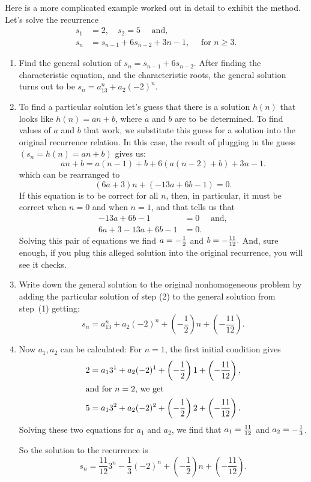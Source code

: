 \clearpage
\begin{exmp}
 Here is a more complicated example worked out in 
 detail to exhibit the
 method. Let's solve the recurrence
\begin{align*}
  s_1 &=2,\quad s_2=5 \quad\text{ and}, \\
  s_n &=s_{n-1}+6s_{n-2}+3n-1, \quad\text{ for $n\geq3.$}
\end{align*}
\begin{enumerate}[label=Step (\arabic*):]
  \item Find the general solution of $s_n=s_{n-1}+6s_{n-2}.$ After
  finding the characteristic equation, and the characteristic roots, the
  general solution turns out to be $s_n=a_13^n+a_2(-2)^n$.
  
  \item To find a particular solution let's guess that there is a
  solution $h(n)$ that looks like $h(n)=an+b$, where $a$ and $b$ are to be
  determined. To find values of $a$ and $b$ that work, we substitute this
  guess for a solution into the original recurrence relation. In this
  case, the result of plugging in the guess $(s_n=h(n)=an+b)$ gives us:
  \[
   an+b=a(n-1)+b+6(a(n-2)+b)+3n-1.
  \]
  which can be rearranged to
  \[
   (6a+3)n+(-13a+6b-1)=0.
  \]
  If this equation is to be correct for all $n$, then, in particular, it
  must be correct when $n=0$ and when $n=1$, and that tells us that
  \begin{align*}
       -13a+6b-1&=0 \quad\text{ and}, \\
   6a+3-13a+6b-1&=0.
  \end{align*} 
  Solving this pair of equations we find $a=-{1\over2}$ and
  $b=-{{11}\over{12}}.$ And, sure enough, if you plug this alleged
  solution into the original recurrence, you will see it checks.
  
  \item Write down the general solution to the original nonhomogeneous
  problem by adding the particular solution of step (2) to the general
  solution from step~(1) getting:
  \[
   s_n=a_13^n+a_2(-2)^n+\left(-\frac{1}{2}\right)n+\left(-{\frac{11}{12}}\right).
  \]
  
  
  \item Now $a_1,a_2$ can be calculated: For $n=1$, the first initial condition
  gives 
  \begin{align*}
    2 &=a_13^1+a_2(-2)^1+ \left(-{1\over2}\right)1+\left(-{{11}\over{12}}\right), \\
    \intertext{and for $n=2$, we get} 
    5 &=a_13^2+a_2(-2)^2+ \left(-{1\over2}\right)2+\left(-{{11}\over{12}}\right).
  \end{align*}
   Solving these two equations for $a_1$ and $a_2$, we find that $a_1=
  {{11}\over{12}}$ and $a_2=-{1\over3}$.\par
  So the solution to the recurrence is
  \[
   s_n={\frac{11}{12}}3^n-{\frac{1}{3}}(-2)^n+\left(-\frac{1}{2}\right)n+\left(-{\frac{11}{12}}\right).
  \]
\end{enumerate}
 

\end{exmp}
\clearpage
